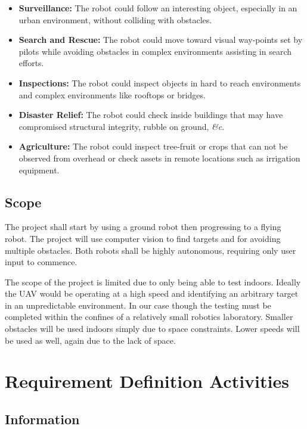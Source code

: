 \documentclass{article}
\begin{document}
		\begin{itemize}
			\item \textbf{Surveillance:} The robot could follow an interesting object, especially in an urban environment, without colliding with obstacles.
			\item \textbf{Search and Rescue:} The robot could move toward visual way-points set by pilots while avoiding obstacles in complex environments assisting in search efforts.
			\item \textbf{Inspections:} The robot could inspect objects in hard to reach environments and complex environments like rooftops or bridges.
			\item \textbf{Disaster Relief:} The robot could check inside buildings that may have compromised structural integrity, rubble on ground, \textit{\&c}.
			\item \textbf{Agriculture:} The robot could inspect tree-fruit or crops that can not be observed from overhead or check assets in remote locations such as irrigation equipment.
		\end{itemize}
		
	\subsection{Scope}
	
	The project shall start by using a ground robot then progressing to a flying robot. The project will use computer vision to find targets and for avoiding multiple obstacles. Both robots shall be highly autonomous, requiring only user input to commence. 

	The scope of the project is limited due to only being able to test indoors. Ideally the UAV would be operating at a high speed and identifying an arbitrary target in an unpredictable environment. In our case though the testing must be completed within the confines of a relatively small robotics laboratory. Smaller obstacles will be used indoors simply due to space constraints. Lower speeds will be used as well, again due to the lack of space. 

\section{Requirement Definition Activities}

	\subsection{Information}
	
\end{document}
